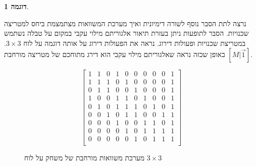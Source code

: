 \documentclass[12pt,leqno]{article}
\theoremstyle{theoremdd}
\newtheorem{example}{דוגמה}[section]
\begin{document}
\begin{example}
\end{example}


נרצה לתת הסבר נוסף לשורה דימיונית
ואיך
מערכת המשוואות מצתמצמת
ביחס למטריצה שכנויות.
הסבר לתופעות ניתן בעזרת תיאור אלגוריתם מילוי עקבי
במקום על טבלה נשתמש במטריצת שכנויות ופעולות דירוג.
נראה את הפעולות דירוג על אותה דוגמה 
על לוח 
$3 \times 3$.
באופן שכזה נראה 
שאלגוריתם מילוי עקבי הוא דירג מתוחכם של מטריצה מורחבת 
$[M | \vec{1}]$.

\begin{figure}[ht]
    \caption{
        מערכת משוואות מורחבת של משחק על לוח 
        $3 \times 3$
    }
    \label{fig: full matrix 3 x 3}
    \begin{english}
        \begin{center}
            \[\left[
            \begin{array}{ccccccccc|c}
                    1& 1& 0& 1& 0& 0& 0& 0& 0& 1 \\
                    1& 1& 1& 0& 1& 0& 0& 0& 0& 1 \\
                    0& 1& 1& 0& 0& 1& 0& 0& 0& 1 \\
                    1& 0& 0& 1& 1& 0& 1& 0& 0& 1 \\
                    0& 1& 0& 1& 1& 1& 0& 1& 0& 1 \\
                    0& 0& 1& 0& 1& 1& 0& 0& 1& 1 \\
                    0& 0& 0& 1& 0& 0& 1& 1& 0& 1 \\
                    0& 0& 0& 0& 1& 0& 1& 1& 1& 1 \\
                    0& 0& 0& 0& 0& 1& 0& 1& 1& 1 \\
            \end{array}
            \right]\]
        \end{center}
    \end{english}
\end{figure}
\end{document}
